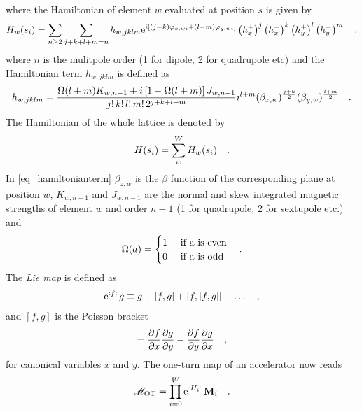 where the Hamiltonian of element $w$ evaluated at position $s$ is given by
%
\begin{equation}
    H_w(s_i) = \sum\limits_{n\geq2} \sum\limits_{j+k+l+m=n} h_{w,jklm}
    \text{e}^{i \left[
        (j-k) \varphi_{x,wi} + (l-m) \varphi_{y,wi}
    \right]}
    \left(h_x^+\right)^j
    \left(h_x^-\right)^k
    \left(h_y^+\right)^l
    \left(h_y^-\right)^m
    \quad .
\end{equation}
%
where $n$ is the mulitpole order (1 for dipole, 2 for quadrupole etc)
and the Hamiltonian term $h_{w,jklm}$ is defined as
%
\begin{equation}
    h_{w,jklm} = 
    \frac{
        \Omega(l+m) K_{w,n-1} + i\left[1-\Omega(l+m)\right] J_{w,n-1}
    }{
        j!\,k!\,l!\,m!\,2^{j+k+l+m}
    }
    i^{l+m}
    (\beta_{x,w})^{\frac{j+k}{2}}
    (\beta_{y,w})^{\frac{l+m}{2}}
    \quad .
    \label{eq_hamiltonianterm}
\end{equation}
%
The Hamiltonian of the whole lattice is denoted by
%
\begin{equation}
    H(s_i) = \sum\limits_w^W H_w(s_i)
    \label{eq_Hamil_sa}
    \quad .
\end{equation}
%
In \eqref{eq_hamiltonianterm} $\beta_{z,w}$ is the $\beta$ function of the corresponding plane at position $w$,
$K_{w,n-1}$ and $J_{w,n-1}$ are the normal and skew integrated magnetic strengths of element $w$ and order $n-1$ (1 for quadrupole, 2 for sextupole etc.)
and 
%
\begin{equation}
    \Omega(a) = 
    \begin{cases}
        1 &\text{ if a is even} \\
        0 &\text{ if a is odd} \\
    \end{cases}
    \quad .
\end{equation}
%
The \emph{Lie map} is defined as
%
\begin{equation}
    \text{e}^{{:}f{:}\,}g \equiv g + [f,g] + [f, [f,g]] + \ldots
    \quad ,
    \label{eq_liemap}
\end{equation}
%
and $[f,g]$ is the Poisson bracket
%
\begin{equation}
    [f,g] = 
    \frac{\partial f}{\partial x} \frac{\partial g}{\partial y}
    - \frac{\partial f}{\partial y}\frac{\partial g}{\partial x}
    \komma
\end{equation}
for canonical variables $x$ and $y$.
%
The one-turn map of an accelerator now reads
%
\begin{equation}
    \mathscr{M}_\text{OT} = \prod\limits_{i=0}^W \text{e}^{{:}H_i{:}\,} \mathbf{M}_i
    \quad .
\end{equation}
